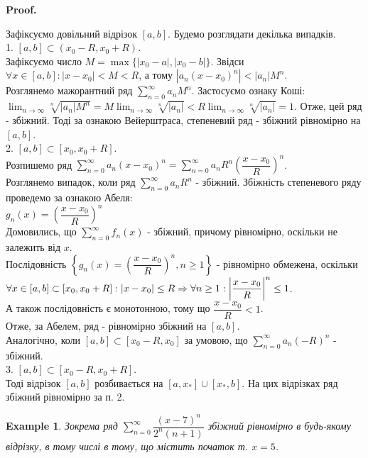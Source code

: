 \documentclass[a4paper, 10pt]{article}
\makeatletter
\def\huge{\displaystyle}
\def\qed{$\blacksquare$}
\theoremstyle{theoremdd}
\theoremstyle{theoremdd}
\theoremstyle{theoremdd}
\theoremstyle{theoremdd}
\newtheorem{example}[theorem]{Example}
\theoremstyle{theoremdd}
\theoremstyle{theoremdd}
\theoremstyle{theoremdd}
\theoremstyle{theoremdd}
\renewenvironment{proof}[1][Proof.\\]{\par
\pushQED{\hfill \qed}%
\normalfont \topsep6\p@\@plus6\p@\relax
\trivlist
\item\relax
{\bfseries
#1\@addpunct{.}}\hspace\labelsep\ignorespaces
}{%
\popQED\endtrivlist\@endpefalse
}
\makeatother
\begin{document}
\begin{proof}
Зафіксуємо довільний відрізок $[a,b]$. Будемо розглядати декілька випадків.\\
1. $[a,b] \subset (x_0-R,x_0+R)$.\\
Зафіксуємо число $M = \max\{|x_0-a|,|x_0-b|\}$. Звідси $\forall x \in [a,b]: |x-x_0| < M < R$, а тому $|a_n(x-x_0)^n| < |a_n| M^n$.\\
Розглянемо мажорантний ряд $\huge \sum_{n=0}^\infty a_n M^n$. Застосуємо ознаку Коші:\\
$\huge \lim_{n \to \infty} \sqrt[n]{|a_n| M^n} = M \lim_{n \to \infty} \sqrt[n]{|a_n|} < R \lim_{n \to \infty} \sqrt[n]{|a_n|} = 1$.
Отже, цей ряд - збіжний. Тоді за ознакою Вейерштраса, степеневий ряд - збіжний рівномірно на $[a,b]$.
\bigskip \\
2. $[a,b] \subset [x_0,x_0+R]$.\\
Розпишемо ряд $\huge \sum_{n=0}^\infty a_n(x-x_0)^n = \sum_{n=0}^\infty a_n R^n \left( \dfrac{x-x_0}{R} \right)^n$.\\
Розглянемо випадок, коли ряд $\huge \sum_{n=0}^\infty a_n R^n$ - збіжний. Збіжність степеневого ряду проведемо за ознакою Абеля:\\
$g_n(x) = \left( \dfrac{x-x_0}{R} \right)^n$\\
Домовились, що $\huge \sum_{n=0}^\infty f_n(x)$ - збіжний, причому рівномірно, оскільки не залежить від $x$.\\
Послідовність $\left\{ g_n(x) = \left( \dfrac{x-x_0}{R} \right)^n, n \geq 1 \right\}$ - рівномірно обмежена, оскільки\\
$\forall x \in [a,b] \subset [x_0, x_0+R]: |x - x_0| \leq R \Rightarrow \forall n \geq 1: \abs{\dfrac{x-x_0}{R}}^n \leq 1$.\\
А також послідовність є монотонною, тому що $\dfrac{x-x_0}{R} < 1$.\\
Отже, за Абелем, ряд - рівномірно збіжний на $[a,b]$.
\bigskip \\
Аналогічно, коли $[a,b] \subset [x_0-R, x_0]$ за умовою, що $\huge \sum_{n=0}^\infty a_n (-R)^n$ - збіжний.
\bigskip \\
3. $[a,b] \subset [x_0-R,x_0+R]$.\\
Тоді відрізок $[a,b]$ розбивається на $[a,x_*] \cup [x_*,b]$. На цих відрізках ряд збіжний рівномірно за п. 2.
\end{proof}

\begin{example}
Зокрема ряд $\huge\sum_{n=0}^\infty \dfrac{(x-7)^n}{2^n (n+1)}$ збіжний рівномірно в будь-якому відрізку, в тому числі в тому, що містить початок т. $x = 5$.
\end{example}
\end{document}
